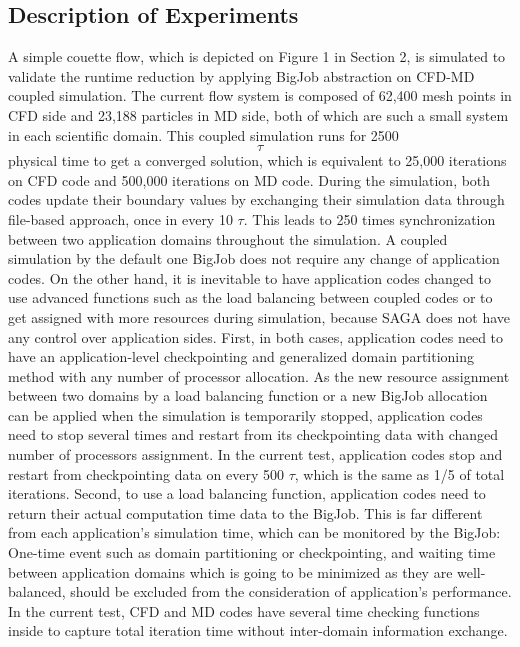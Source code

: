 \documentclass[conference,final]{IEEEtran}
\begin{document}
\subsection{Description of Experiments}
A simple couette flow, which is depicted on Figure 1 in Section 2, is simulated to validate the runtime reduction by applying BigJob abstraction on CFD-MD coupled simulation. The current flow system is composed of 62,400 mesh points in CFD side and 23,188 particles in MD side, both of which are such a small system in each scientific domain. This coupled simulation runs for 2500 $$\tau$$ physical time to get a converged solution, which is equivalent to 25,000 iterations on CFD code and 500,000 iterations on MD code. During the simulation, both codes update their boundary values by exchanging their simulation data through file-based approach, once in every 10 $\tau$. This leads to 250 times synchronization between two application domains throughout the simulation.
A coupled simulation by the default one BigJob does not require any change of application codes. On the other hand, it is inevitable to have application codes changed to use advanced functions such as the load balancing between coupled codes or to get assigned with more resources during simulation, because SAGA does not have any control over application sides. First, in both cases, application codes need to have an application-level checkpointing and generalized domain partitioning method with any number of processor allocation. As the new resource assignment between two domains by a load balancing function or a new BigJob allocation can be applied when the simulation is temporarily stopped, application codes need to stop several times and restart from its checkpointing data with changed number of processors assignment. In the current test, application codes stop and restart from checkpointing data on every 500 $\tau$, which is the same as 1/5 of total iterations. Second, to use a load balancing function, application codes need to return their actual computation time data to the BigJob. This is far different from each application's simulation time, which can be monitored by the BigJob: One-time event such as domain partitioning or checkpointing, and waiting time between application domains which is going to be minimized as they are well-balanced, should be excluded from the consideration of application's performance. In the current test, CFD and MD codes have several time checking functions inside to capture total iteration time without inter-domain information exchange.
\end{document}
